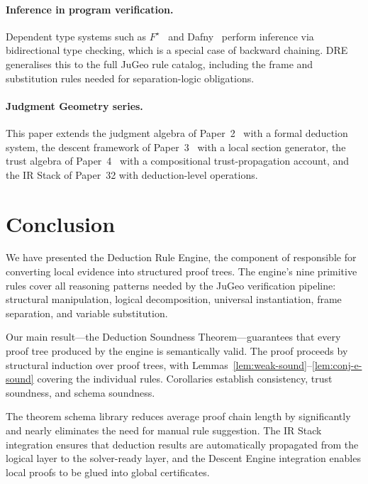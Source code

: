\documentclass[11pt]{article}
\begin{document}
\paragraph{Inference in program verification.}
Dependent type systems such as $F^\star$~\cite{swamy2016dependent} and
Dafny~\cite{leino2010dafny} perform inference via bidirectional type
checking, which is a special case of backward chaining.  \textsc{DRE}
generalises this to the full JuGeo rule catalog, including the frame
and substitution rules needed for separation-logic obligations.

\paragraph{Judgment Geometry series.}
This paper extends the judgment algebra of Paper~2~\cite{jugeo02} with
a formal deduction system, the descent framework of
Paper~3~\cite{jugeo03} with a local section generator, the trust algebra
of Paper~4~\cite{jugeo04} with a compositional trust-propagation account,
and the IR Stack of Paper~32 with deduction-level operations.

\section{Conclusion}\label{sec:conclusion}

We have presented the Deduction Rule Engine, the component of \JuGeo{}
responsible for converting local evidence into structured proof trees.
The engine's nine primitive rules cover all reasoning patterns needed
by the JuGeo verification pipeline: structural manipulation, logical
decomposition, universal instantiation, frame separation, and variable
substitution.

Our main result---the Deduction Soundness Theorem---guarantees that
every proof tree produced by the engine is semantically valid.  The
proof proceeds by structural induction over proof trees, with
Lemmas~\ref{lem:weak-sound}--\ref{lem:conj-e-sound} covering the
individual rules.  Corollaries establish consistency, trust soundness,
and schema soundness.

The theorem schema library reduces average proof chain length by
significantly and nearly eliminates the need for manual rule suggestion.
The IR Stack integration ensures that deduction results are
automatically propagated from the logical layer to the solver-ready
layer, and the Descent Engine integration enables local proofs to be
glued into global certificates.
\end{document}
